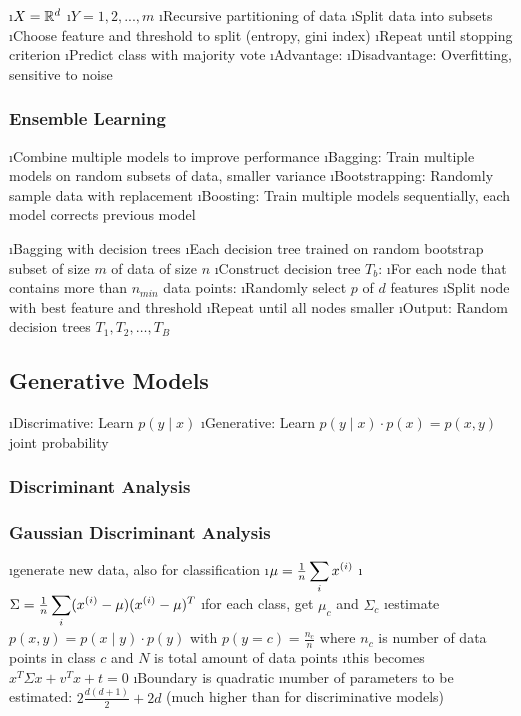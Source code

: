 \bi
\i $X = \mathbb{R}^d$
\i $Y = {1,2,...,m}$
\i Recursive partitioning of data
\i Split data into subsets
\i Choose feature and threshold to split (entropy, gini index)
\i Repeat until stopping criterion
\i Predict class with majority vote
\i Advantage:
\i Disadvantage: Overfitting, sensitive to noise
\ei

\subsubsection{Ensemble Learning}

\bi
\i Combine multiple models to improve performance
\i Bagging: Train multiple models on random subsets of data, smaller variance
\i Bootstrapping: Randomly sample data with replacement
\i Boosting: Train multiple models sequentially, each model corrects previous model
\ei


\bi
\i Bagging with decision trees
\i Each decision tree trained on random bootstrap subset of size $m$ of data of size $n$
\i Construct decision tree $T_b$:
\bi
\i For each node that contains more than $n_{min}$ data points:
\i Randomly select $p$ of $d$ features
\i Split node with best feature and threshold
\i Repeat until all nodes smaller
\ei
\i Output: Random decision trees $T_1, T_2, \ldots, T_B$
\ei

\subsection{Generative Models}

\bi
\i Discrimative: Learn $p(y \mid x)$
\i Generative: Learn $p(y \mid x) \cdot p(x) = p(x, y)$ joint probability
\ei

\subsubsection{Discriminant Analysis}

\subsubsection{Gaussian Discriminant Analysis}

\bi
\i generate new data, also for classification
\i $\mu = \frac{1}{n} \displaystyle\sum_i x^{(i)}$
\i $\Sigma = \frac{1}{n} \displaystyle\sum_i (x^{(i)} - \mu) (x^{(i)} - \mu)^T$
\i for each class, get $\mu_c$ and $\Sigma_c$
\i estimate $p(x,y) = p(x \mid y) \cdot p(y)$ with $p(y=c) = \frac{n_c}{n}$ where $n_c$ is number of data points in class $c$ and $N$ is total amount of data points
\i this becomes $x^T \Sigma x + v^Tx + t=0$
\i Boundary is quadratic
\i number of parameters to be estimated: $2 \frac{d(d+1)}{2} + 2d$
(much higher than for discriminative models)
\ei

